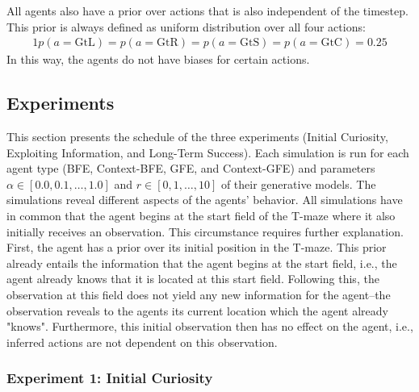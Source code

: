 All agents also have a prior over actions that is also independent of the timestep. This prior is always defined as uniform distribution over all four actions:
\begin{alignat}{1}
    p(a=\text{GtL}) = p(a=\text{GtR}) = p(a=\text{GtS}) = p(a=\text{GtC}) = 0.25
\end{alignat}
In this way, the agents do not have biases for certain actions.


\subsection{Experiments}
\label{sec:simulations}

This section presents the schedule of the three experiments (Initial Curiosity, Exploiting Information, and Long-Term Success). Each simulation is run for each agent type (BFE, Context-BFE, GFE, and Context-GFE) and parameters \(\alpha \in [0.0, 0.1, \dots, 1.0]\) and \(r \in [0, 1, \dots, 10]\) of their generative models. The simulations reveal different aspects of the agents' behavior.
All simulations have in common that the agent begins at the start field of the T-maze where it also initially receives an observation. This circumstance requires further explanation. First, the agent has a prior over its initial position in the T-maze. This prior already entails the information that the agent begins at the start field, i.e., the agent already knows that it is located at this start field. Following this, the observation at this field does not yield any new information for the agent--the observation reveals to the agents its current location which the agent already "knows". Furthermore, this initial observation then has no effect on the agent, i.e., inferred actions are not dependent on this observation.

\subsubsection{Experiment 1: Initial Curiosity}


